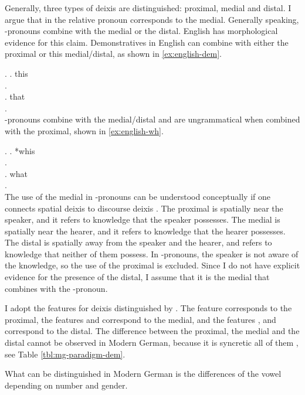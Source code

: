 Generally, three types of deixis are distinguished: proximal, medial and distal. I argue that  in the relative pronoun corresponds to the medial. Generally speaking, -pronouns combine with the medial or the distal. English has morphological evidence for this claim. Demonstratives in English can combine with either the proximal or this medial/distal, as shown in \ref{ex:english-dem}.

\ex.\label{ex:english-dem}
 \ag. this\\
 .\\
 \bg. that\\
 .\\

-pronouns combine with the medial/distal and are ungrammatical when combined with the proximal, shown in \ref{ex:english-wh}.

\ex.\label{ex:english-wh}
 \ag. *whis\\
 .\\
 \bg. what\\
 .\\

The use of the medial in -pronouns can be understood conceptually if one connects spatial deixis to discourse deixis \citep[cf.][]{colasanti2019}. The proximal is spatially near the speaker, and it refers to knowledge that the speaker possesses. The medial is spatially near the hearer, and it refers to knowledge that the hearer possesses. The distal is spatially away from the speaker and the hearer, and refers to knowledge that neither of them possess. In -pronouns, the speaker is not aware of the knowledge, so the use of the proximal is excluded. Since I do not have explicit evidence for the presence of the distal, I assume that it is the medial that combines with the -pronoun.

I adopt the features for deixis distinguished by \citet{lander2018}. The feature  corresponds to the proximal, the features  and  correspond to the medial, and the features ,  and  correspond to the distal.
The difference between the proximal, the medial and the distal cannot be observed in Modern German, because it is syncretic all of them , see Table \ref{tbl:mg-paradigm-dem}.

What can be distinguished in Modern German is the differences of the vowel depending on number and gender.

